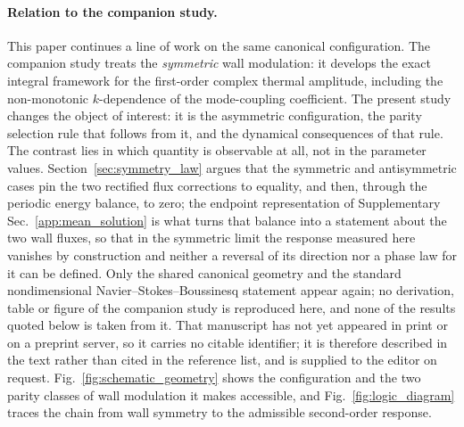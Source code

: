 \documentclass[12pt,a4paper]{article}
\begin{document}
\paragraph{Relation to the companion study.}
This paper continues a line of work on the same canonical configuration. The companion study
treats the \emph{symmetric} wall modulation: it develops the exact integral framework for the
first-order complex thermal amplitude, including the non-monotonic
$k$-dependence of the mode-coupling coefficient. The present study changes the object of
interest: it is the asymmetric configuration, the parity selection rule that follows from
it, and the dynamical consequences of that rule. The contrast lies in which quantity is
observable at all, not in the parameter values. Section~\ref{sec:symmetry_law} argues that the symmetric and
antisymmetric cases pin the two rectified flux corrections to equality, and then, through the
periodic energy balance, to zero; the endpoint representation of Supplementary
Sec.~\ref{app:mean_solution} is what turns that balance into a statement about the two wall
fluxes, so that in the symmetric limit the response measured here
vanishes by construction and neither a reversal of its direction nor a phase law for it can be
defined. Only the shared canonical geometry and the standard nondimensional
Navier--Stokes--Boussinesq statement appear again; no derivation, table or figure of the
companion study is reproduced here, and none of the results quoted below is taken from it.
That manuscript has not yet appeared in print or on a preprint server, so it carries no citable
identifier; it is therefore described in the text rather than cited in the reference list, and
is supplied to the editor on request.
Fig.~\ref{fig:schematic_geometry} shows the configuration and the two parity classes of wall
modulation it makes accessible, and Fig.~\ref{fig:logic_diagram} traces the chain from wall
symmetry to the admissible second-order response.
\end{document}
